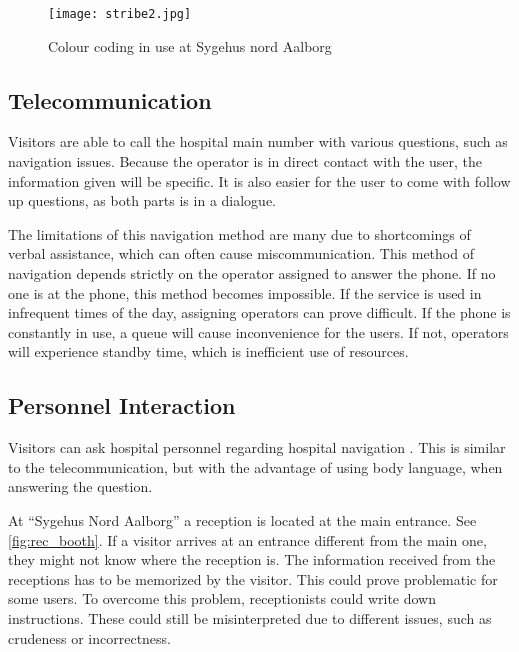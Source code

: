 \begin{figure}[htb]
  \begin{center} 
    \texttt{[image: stribe2.jpg]}
  \end{center}
  \caption{Colour coding in use at Sygehus nord Aalborg}
  \label{fig:colour_floor}
\end{figure}

\subsection{Telecommunication}\label{sub:pho}

Visitors are able to call the hospital main number with various questions, such as navigation issues\cite{sign_ring}. Because the operator is in direct contact with the user, the information given will be specific. It is also easier for the user to come with follow up questions, as both parts is in a dialogue.
 
The limitations of this navigation method are many due to shortcomings of verbal assistance, which can often cause miscommunication. This method of navigation depends strictly on the operator assigned to answer the phone. If no one is at the phone, this method becomes impossible.
If the service is used in infrequent times of the day, assigning operators can prove difficult. If the phone is constantly in use, a queue will cause inconvenience for the users. If not, operators will experience standby time, which is inefficient use of resources.

\subsection{Personnel Interaction}\label{sub:human}
Visitors can ask hospital personnel regarding hospital navigation \cite{job}. This is similar to the telecommunication, but with the advantage of using body language, when answering the question\cite{body_vs_phone}.

At \enquote{Sygehus Nord Aalborg} a reception is located at the main entrance. See \cref{fig:rec_booth}. If a visitor arrives at an entrance different from the main one, they might not know where the reception is. The information received from the receptions has to be memorized by the visitor. This could prove problematic for some users. To overcome this problem, receptionists could write down instructions. These could still be misinterpreted due to different issues, such as crudeness or incorrectness.

